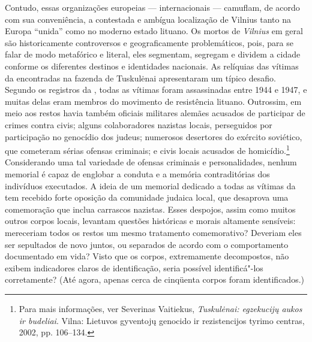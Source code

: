 Contudo, essas organizações europeias --- internacionais --- camuflam, de
acordo com sua conveniência, a contestada e ambígua localização de
Vilnius tanto na Europa ``unida'' como no moderno estado lituano. Os
mortos de \textit{Vilnius} em geral são historicamente controversos e
geograficamente problemáticos, pois, para se falar de modo metafórico e
literal, eles segmentam, segregam e dividem a cidade conforme os
diferentes destinos e identidades nacionais. As relíquias das vítimas da
 encontradas na fazenda de Tuskulėnai apresentaram um típico
desafio. Segundo os registros da , todas as vítimas foram
assassinadas entre 1944 e 1947, e muitas delas eram membros do movimento
de resistência lituano. Outrossim, em meio aos restos havia também
oficiais militares alemães acusados de participar de crimes contra
civis; alguns colaboradores nazistas locais, perseguidos por
participação no genocídio dos judeus; numerosos desertores do exército
soviético, que cometeram sérias ofensas criminais; e civis locais
acusados de homicídio.\footnote{Para mais informações, ver Severinas Vaitiekus, \textit{Tuskulėnai: egzekucijų aukos ir budeliai}. Vilna: Lietuvos gyventojų genocido ir rezistencijos tyrimo centras, 2002, pp. 106--134.} Considerando uma tal variedade de ofensas criminais e personalidades, nenhum memorial é capaz de englobar a conduta e a
memória contraditórias dos indivíduos executados. A ideia de um memorial
dedicado a todas as vítimas da  tem recebido forte oposição da
comunidade judaica local, que desaprova uma comemoração que inclua
carrascos nazistas. Esses despojos, assim como muitos outros corpos
locais, levantam questões históricas e morais altamente sensíveis:
mereceriam todos os restos um mesmo tratamento comemorativo? Deveriam
eles ser sepultados de novo juntos, ou separados de acordo com o
comportamento documentado em vida? Visto que os corpos, extremamente
decompostos, não exibem indicadores claros de identificação, seria
possível identificá"-los corretamente? (Até agora, apenas cerca de
cinqüenta corpos foram identificados.)

